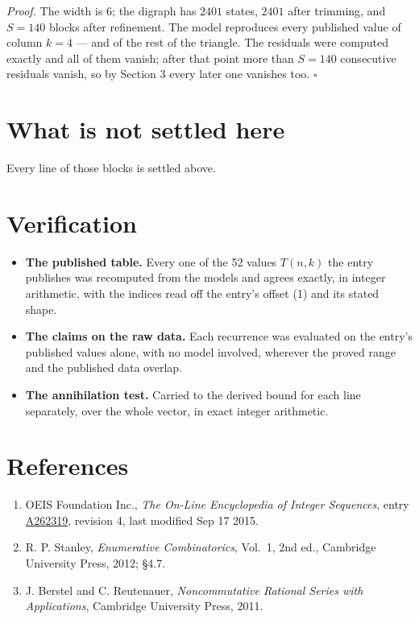 \documentclass[11pt]{article}
\theoremstyle{definition}
\begin{document}
{\itshape Proof.} The width is $6$; the digraph has $2401$ states, $2401$ after trimming, and $S = 140$ blocks after refinement. The model reproduces every published value of column $k = 4$ --- and of the rest of the triangle. The residuals were computed exactly and all of them vanish; after that point more than $S = 140$ consecutive residuals vanish, so by Section 3 every later one vanishes too. $\square$

\section{What is not settled here}

Every line of those blocks is settled above.

\section{Verification}

\begin{itemize}

\item {\bfseries The published table.} Every one of the 52 values $T(n,k)$ the entry publishes was recomputed from the models and agrees exactly, in integer arithmetic, with the indices read off the entry's offset (1) and its stated shape.

\item {\bfseries The claims on the raw data.} Each recurrence was evaluated on the entry's published values alone, with no model involved, wherever the proved range and the published data overlap.

\item {\bfseries The annihilation test.} Carried to the derived bound for each line separately, over the whole vector, in exact integer arithmetic.

\end{itemize}

\section{References}

\begin{enumerate}

\item OEIS Foundation Inc., \emph{The On-Line Encyclopedia of Integer Sequences}, entry \href{https://oeis.org/A262319}{A262319}, revision 4, last modified Sep 17 2015.

\item R. P. Stanley, \emph{Enumerative Combinatorics}, Vol.~1, 2nd ed., Cambridge University Press, 2012; \S4.7.

\item J. Berstel and C. Reutenauer, \emph{Noncommutative Rational Series with Applications}, Cambridge University Press, 2011.

\end{enumerate}
\end{document}
